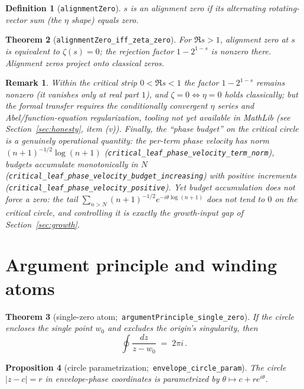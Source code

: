 \documentclass[submission]{jsfds}
\newtheorem{theorem}{Theorem}
\newtheorem{proposition}[theorem]{Proposition}
\newtheorem{definition}[theorem]{Definition}
\newtheorem*{remark}{Remark}
\newcommand{\Lean}[1]{\texttt{#1}}
\newcommand{\abs}[1]{\lvert #1\rvert}
\begin{document}
\begin{definition}[\Lean{alignmentZero}]\label{def:align}
$s$ is an \emph{alignment zero} if its alternating rotating-vector sum (the
$\eta$ shape) equals zero.
\end{definition}

\begin{theorem}[\Lean{alignmentZero_iff_zeta_zero}]\label{thm:align}
For $\Re s>1$, alignment zero at $s$ is equivalent to $\zeta(s)=0$; the
rejection factor $1-2^{1-s}$ is nonzero there. Alignment zeros project onto
classical zeros.
\end{theorem}

\begin{remark}
Within the critical strip $0<\Re s<1$ the factor $1-2^{1-s}$ remains nonzero
(it vanishes only at real part $1$), and $\zeta=0\Longleftrightarrow\eta=0$
holds classically; but the formal transfer requires the conditionally convergent
$\eta$ series and Abel/function-equation regularization, tooling not yet
available in MathLib (see Section~\ref{sec:honesty}, item (v)). Finally, the
``phase budget'' on the critical circle is a genuinely operational quantity:
the per-term phase velocity has norm $(n+1)^{-1/2}\log(n+1)$
(\Lean{critical_leaf_phase_velocity_term_norm}), budgets accumulate
monotonically in $N$ (\Lean{critical_leaf_phase_velocity_budget_increasing})
with positive increments (\Lean{critical_leaf_phase_velocity_positive}). Yet
budget accumulation does not force a zero: the tail
$\sum_{n>N}(n+1)^{-1/2}e^{-i\theta\log(n+1)}$ does not tend to $0$ on the
critical circle, and controlling it is exactly the growth-input gap of
Section~\ref{sec:growth}.
\end{remark}

\section{Argument principle and winding atoms}\label{sec:winding}

\begin{theorem}[single-zero atom;\,
\Lean{argumentPrinciple_single_zero}]\label{thm:atom}
If the circle encloses the single point $w_{0}$ and excludes the origin's
singularity, then
\[
  \oint \frac{dz}{z-w_{0}} \;=\; 2\pi i\, .
\]
\end{theorem}

\begin{proposition}[circle parametrization;\,
\Lean{envelope_circle_param}]\label{prop:param}
The circle $\abs{z-c}=r$ in envelope-phase coordinates is parametrized by
$\theta\mapsto c+r e^{i\theta}$.
\end{proposition}
\end{document}
